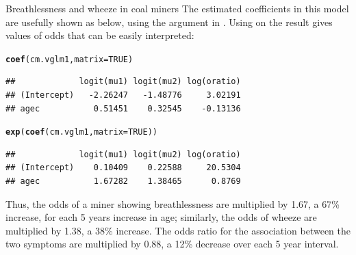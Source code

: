 \documentclass[11pt]{book}\usepackage[]{graphicx}\usepackage[]{color}
\makeatletter
\newcommand{\hlnum}[1]{\textcolor[rgb]{0.686,0.059,0.569}{#1}}%
\newcommand{\hlstd}[1]{\textcolor[rgb]{0.345,0.345,0.345}{#1}}%
\newcommand{\hlkwc}[1]{\textcolor[rgb]{0.333,0.667,0.333}{#1}}%
\newcommand{\hlkwd}[1]{\textcolor[rgb]{0.737,0.353,0.396}{\textbf{#1}}}%
\newenvironment{kframe}{%
 \def\at@end@of@kframe{}%
 \ifinner\ifhmode%
  \def\at@end@of@kframe{\end{minipage}}%
  \begin{minipage}{\columnwidth}%
 \fi\fi%
 \def\FrameCommand##1{\hskip\@totalleftmargin \hskip-\fboxsep
 \colorbox{shadecolor}{##1}\hskip-\fboxsep
     \hskip-\linewidth \hskip-\@totalleftmargin \hskip\columnwidth}%
 \MakeFramed {\advance\hsize-\width
   \@totalleftmargin\z@ \linewidth\hsize
   \@setminipage}}%
 {\par\unskip\endMakeFramed%
 \at@end@of@kframe}
\newenvironment{knitrout}{}{} %
\renewenvironment{knitrout}{\small\renewcommand{\baselinestretch}{.85}}{} %
\makeatother
\begin{document}
\begin{Example}[coalminers]{Breathlessness and wheeze in coal miners}
The estimated coefficients in this model are usefully shown as below, using the
argument  in .
Using 
on the result gives values of odds that can be easily interpreted:
\begin{knitrout}
\color{fgcolor}\begin{kframe}
\begin{alltt}
\hlkwd{coef}\hlstd{(cm.vglm1,} \hlkwc{matrix}\hlstd{=}\hlnum{TRUE}\hlstd{)}
\end{alltt}
\begin{verbatim}
##             logit(mu1) logit(mu2) log(oratio)
## (Intercept)   -2.26247   -1.48776     3.02191
## agec           0.51451    0.32545    -0.13136
\end{verbatim}
\begin{alltt}
\hlkwd{exp}\hlstd{(}\hlkwd{coef}\hlstd{(cm.vglm1,} \hlkwc{matrix}\hlstd{=}\hlnum{TRUE}\hlstd{))}
\end{alltt}
\begin{verbatim}
##             logit(mu1) logit(mu2) log(oratio)
## (Intercept)    0.10409    0.22588     20.5304
## agec           1.67282    1.38465      0.8769
\end{verbatim}
\end{kframe}
\end{knitrout}
Thus, the odds of a miner showing breathlessness are multiplied by 1.67, a 67\% increase,
for each 5 years increase in age;  similarly, the odds of wheeze are multiplied by 1.38,
a 38\% increase. The odds ratio for the association between the two symptoms are multiplied
by 0.88, a 12\% decrease over each 5 year interval.



\end{Example}
\end{document}
